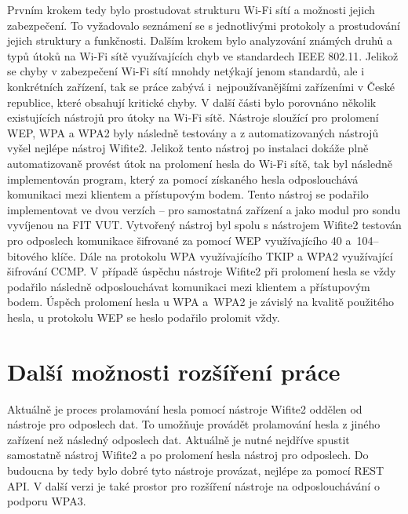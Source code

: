 Prvním krokem tedy bylo prostudovat strukturu Wi-Fi sítí a možnosti jejich zabezpečení. To vyžadovalo seznámení se s jednotlivými protokoly a prostudování jejich struktury a funkčnosti. Dalším krokem bylo analyzování známých druhů a typů útoků na Wi-Fi sítě využívajících chyb ve standardech IEEE 802.11. Jelikož se chyby v zabezpečení Wi-Fi sítí mnohdy netýkají jenom standardů, ale i konkrétních zařízení, tak se práce zabývá i~nejpoužívanějšími zařízeními v České republice, které obsahují kritické chyby. V další části bylo porovnáno několik existujících nástrojů pro útoky na Wi-Fi sítě. Nástroje sloužící pro prolomení WEP, WPA a WPA2 byly následně testovány a z automatizovaných nástrojů vyšel nejlépe nástroj Wifite2. Jelikož tento nástroj po instalaci dokáže plně automatizovaně provést útok na prolomení hesla do Wi-Fi sítě, tak byl následně implementován program, který za pomocí získaného hesla odposlouchává komunikaci mezi klientem a přístupovým bodem. Tento nástroj se podařilo implementovat ve dvou verzích -- pro samostatná zařízení a jako modul pro sondu vyvíjenou na FIT VUT. Vytvořený nástroj byl spolu s nástrojem Wifite2 testován pro odposlech komunikace šifrované za pomocí WEP využívajícího 40 a~104--bitového klíče. Dále na protokolu WPA využívajícího TKIP a WPA2 využívající šifrování CCMP. V případě úspěchu nástroje Wifite2 při prolomení hesla se vždy podařilo následně odposlouchávat komunikaci mezi klientem a přístupovým bodem. Úspěch prolomení hesla u WPA a~WPA2 je závislý na kvalitě použitého hesla, u protokolu WEP se heslo podařilo prolomit vždy.

\section{Další možnosti rozšíření práce}
Aktuálně je proces prolamování hesla pomocí nástroje Wifite2 oddělen od nástroje pro odposlech dat. To umožňuje provádět prolamování hesla z jiného zařízení než následný odposlech dat. Aktuálně je nutné nejdříve spustit samostatně nástroj Wifite2 a po prolomení hesla nástroj pro odposlech. Do budoucna by tedy bylo dobré tyto nástroje provázat, nejlépe za pomocí REST API. V další verzi je také prostor pro rozšíření nástroje na odposlouchávání o podporu WPA3.